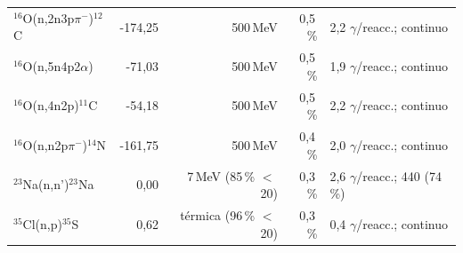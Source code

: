 \documentclass[11pt,a4paper]{article}
\begin{document}
{\begin{longtable}{p{4.4cm}rrrp{4.6cm}}
$^{16}$O(n,2n3p$\pi^-$)$^{12}$C & -174,25 & 500\,MeV & 0,5\,\% & 2,2 $\gamma$/reacc.; continuo \\
$^{16}$O(n,5n4p2$\alpha$) & -71,03 & 500\,MeV & 0,5\,\% & 1,9 $\gamma$/reacc.; continuo \\
$^{16}$O(n,4n2p)$^{11}$C & -54,18 & 500\,MeV & 0,5\,\% & 2,2 $\gamma$/reacc.; continuo \\
$^{16}$O(n,n2p$\pi^-$)$^{14}$N & -161,75 & 500\,MeV & 0,4\,\% & 2,0 $\gamma$/reacc.; continuo \\
$^{23}$Na(n,n')$^{23}$Na & 0,00 & 7\,MeV (85\,\% $<$\,20) & 0,3\,\% & 2,6 $\gamma$/reacc.; 440 (74\,\%) \\
$^{35}$Cl(n,p)$^{35}$S & 0,62 & térmica (96\,\% $<$\,20) & 0,3\,\% & 0,4 $\gamma$/reacc.; continuo \\
\bottomrule\end{longtable}}
\end{document}
